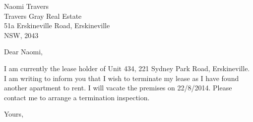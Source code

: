 \documentclass{letter}
\begin{document}
\begin{letter}{Naomi Travers \\ Travers Gray Real Estate \\ 51a Erskineville Road, Erskineville \\ NSW, 2043}
\opening{Dear Naomi,}

I am currently the lease holder of Unit 434, 221 Sydney Park Road, Erskineville. 
I am writing to inform you that I wish to terminate my lease as I have 
found another apartment to rent. I will vacate the premises on 22/8/2014.
Please contact me to arrange a termination inspection.

\closing{Yours,}

\end{letter}
\end{document}
